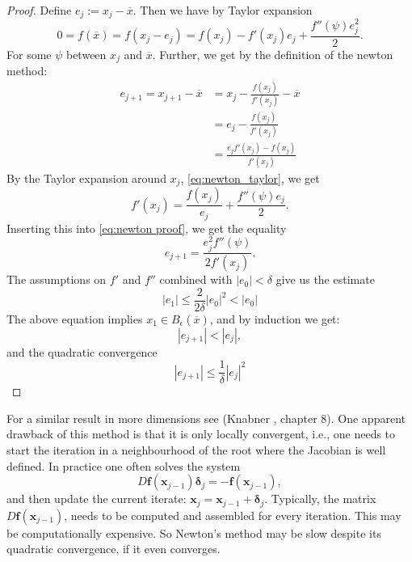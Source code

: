 \documentclass[../Main/main.tex]{subfiles}
\begin{document}
\begin{proof}
	Define $e_j:=x_j-\overline{x}$. Then we have by Taylor expansion
	\begin{equation}\label{eq:newton_taylor}
		0 = f(\overline{x})=f(x_j-e_j) = f(x_j)-f'(x_j)e_j + \frac{f''(\psi)e_j^2}{2}.
	\end{equation}
	For some $\psi$ between $x_j$ and $\overline{x}$. Further, we get by the definition of the newton method:
	\begin{equation}\label{eq:newton proof}
		\begin{aligned}
			e_{j+1} = x_{j+1}-\overline{x} &= x_j-\frac{f(x_j)}{f'(x_j)}-\overline{x}\\
			&=e_j - \frac{f(x_j)}{f'(x_j)}\\ &= \frac{e_j f'(x_j)-f(x_j)}{f'(x_j)}
		\end{aligned}
	\end{equation}
	By the Taylor expansion around $x_j$, \eqref{eq:newton_taylor}, we get
	\begin{equation}
		f'(x_j)=\frac{f(x_j)}{e_j} + \frac{f''(\psi)e_j}{2}.
	\end{equation}
	Inserting this into \eqref{eq:newton proof}, we get the equality
	\begin{equation}
		e_{j+1} = \frac{e_j^2f''(\psi)}{2f'(x_j)}.
	\end{equation}
	The assumptions on $f'$ and  $f''$ combined with $|e_0|<\delta$ give us the estimate
	\begin{equation}
		| e_{1} | \leq \frac{2}{2\delta}|e_0|^2<|e_0|
	\end{equation}
	The above equation implies $x_1\in B_{\epsilon}(\overline{x})$, and by induction we get:
	\begin{equation}
		|e_{j+1}|<|e_j|,
	\end{equation}
	and the quadratic convergence
	\begin{equation}
		| e_{j+1} | \leq \frac{1}{\delta}|e_j|^2
	\end{equation}
\end{proof}
For a similar result in more dimensions see (Knabner \cite{Knabner}, chapter 8). One apparent drawback of this method is that it is only locally convergent, i.e., one needs to start the iteration in a neighbourhood of the root where the Jacobian is well defined. In practice one often solves the system
\begin{equation}
	D\pmb{f}(\pmb{x}_{j-1})\pmb{\delta}_{j} = -\pmb{f}(\pmb{x}_{j-1}),
\end{equation}
and then update the current iterate: $\pmb{x}_j = \pmb{x}_{j-1} + \pmb{\delta}_{j}$. Typically, the matrix $D\pmb{f}(\pmb{x}_{j-1})$, needs to be computed and assembled for every iteration. This may be computationally expensive. So Newton's method may be slow despite its quadratic convergence, if it even converges.\par 
\end{document}
